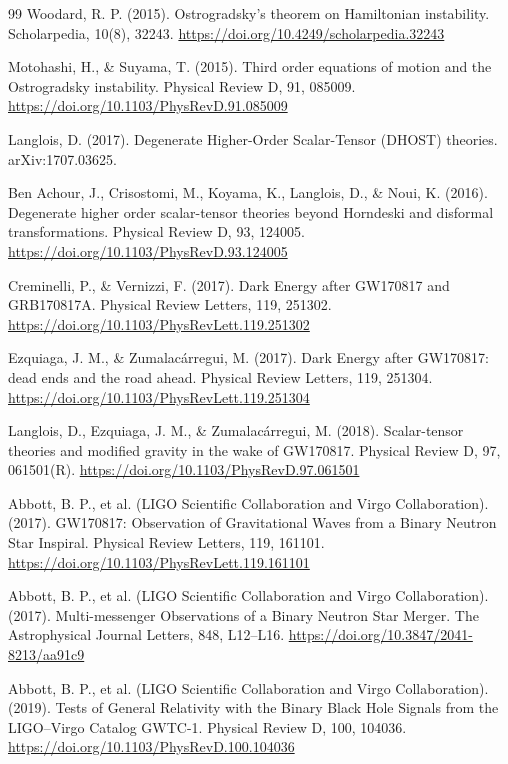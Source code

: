 \begin{thebibliography}{99}
		Woodard, R. P. (2015). Ostrogradsky’s theorem on Hamiltonian instability. Scholarpedia, 10(8), 32243. \url{https://doi.org/10.4249/scholarpedia.32243}
		
		Motohashi, H., \& Suyama, T. (2015). Third order equations of motion and the Ostrogradsky instability. Physical Review D, 91, 085009. \url{https://doi.org/10.1103/PhysRevD.91.085009}
		
		Langlois, D. (2017). Degenerate Higher-Order Scalar-Tensor (DHOST) theories. arXiv:1707.03625.
		
		Ben Achour, J., Crisostomi, M., Koyama, K., Langlois, D., \& Noui, K. (2016). Degenerate higher order scalar-tensor theories beyond Horndeski and disformal transformations. Physical Review D, 93, 124005. \url{https://doi.org/10.1103/PhysRevD.93.124005}
		
		Creminelli, P., \& Vernizzi, F. (2017). Dark Energy after GW170817 and GRB170817A. Physical Review Letters, 119, 251302. \url{https://doi.org/10.1103/PhysRevLett.119.251302}
		
		Ezquiaga, J. M., \& Zumalacárregui, M. (2017). Dark Energy after GW170817: dead ends and the road ahead. Physical Review Letters, 119, 251304. \url{https://doi.org/10.1103/PhysRevLett.119.251304}
		
		Langlois, D., Ezquiaga, J. M., \& Zumalacárregui, M. (2018). Scalar-tensor theories and modified gravity in the wake of GW170817. Physical Review D, 97, 061501(R). \url{https://doi.org/10.1103/PhysRevD.97.061501}
		
		Abbott, B. P., et al. (LIGO Scientific Collaboration and Virgo Collaboration). (2017). GW170817: Observation of Gravitational Waves from a Binary Neutron Star Inspiral. Physical Review Letters, 119, 161101. \url{https://doi.org/10.1103/PhysRevLett.119.161101}
		
		Abbott, B. P., et al. (LIGO Scientific Collaboration and Virgo Collaboration). (2017). Multi-messenger Observations of a Binary Neutron Star Merger. The Astrophysical Journal Letters, 848, L12–L16. \url{https://doi.org/10.3847/2041-8213/aa91c9}
		
		Abbott, B. P., et al. (LIGO Scientific Collaboration and Virgo Collaboration). (2019). Tests of General Relativity with the Binary Black Hole Signals from the LIGO–Virgo Catalog GWTC-1. Physical Review D, 100, 104036. \url{https://doi.org/10.1103/PhysRevD.100.104036}
		

\end{thebibliography}
